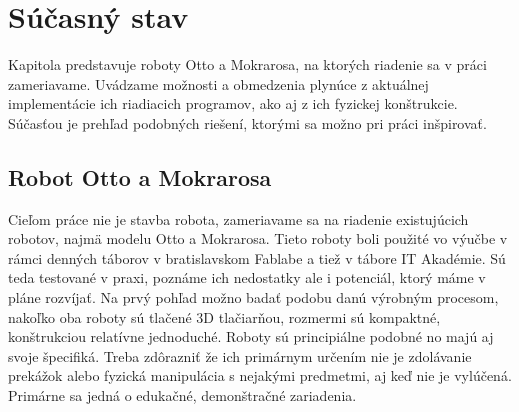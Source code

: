 \chapter{Súčasný stav}

\label{kap:vychodisko}

Kapitola predstavuje roboty Otto a Mokrarosa, na ktorých riadenie sa v práci zameriavame. Uvádzame možnosti a obmedzenia plynúce z aktuálnej implementácie ich riadiacich programov, ako aj z ich fyzickej konštrukcie. Súčasťou je prehľad podobných riešení, ktorými sa možno pri práci inšpirovať.

\section{Robot Otto a Mokrarosa}
Cieľom práce nie je stavba robota, zameriavame sa na riadenie existujúcich robotov, najmä modelu Otto a Mokrarosa. Tieto roboty boli použité vo výučbe v rámci denných táborov v bratislavskom Fablabe a tiež v tábore IT Akadémie. Sú teda testované v praxi, poznáme ich nedostatky ale i potenciál, ktorý máme v pláne rozvíjať. Na prvý pohľad možno badať podobu danú výrobným procesom, nakoľko oba roboty sú tlačené 3D tlačiarňou, rozmermi sú kompaktné, konštrukciou relatívne jednoduché. Roboty sú principiálne podobné no majú aj svoje špecifiká. Treba zdôrazniť že ich primárnym určením nie je zdolávanie prekážok alebo fyzická manipulácia s nejakými predmetmi, aj keď nie je vylúčená. Primárne sa jedná o edukačné, demonštračné zariadenia.


